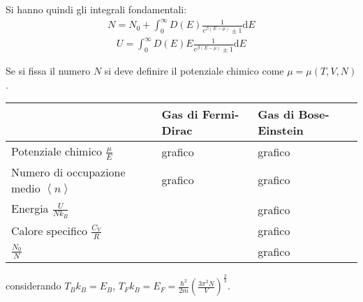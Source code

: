 Si hanno quindi gli integrali fondamentali:
\begin{equation}\begin{split}
N=N_0+\int_{0}^{\infty }{D\left(E\right)\frac{1}{e^{\beta\left(E-\mu\right)}\pm 1} \textrm{d}E}
\end{split}\end{equation}
\begin{equation}\begin{split}
U=\int_{0}^{\infty }{D\left(E\right)E\frac{1}{e^{\beta\left(E-\mu\right)}\pm 1} \textrm{d}E}
\end{split}\end{equation}

Se si fissa il numero $N$ si deve definire il potenziale chimico come $\mu=\mu\left(T,V,N\right)$.

\begin{tabularx}{\textwidth}{lXX}
\toprule
 & Gas di Fermi-Dirac & Gas di Bose-Einstein \\
\midrule
Potenziale chimico $\frac{\mu}{E}$ & grafico & grafico \\
Numero di occupazione medio $\left\langle n \right\rangle$ & grafico & grafico \\
Energia $\frac{U}{Nk_B}$ &  & grafico \\
Calore specifico $\frac{C_V}{R}$ &  & grafico \\
$\frac{N_0}{N}$ &  & grafico \\
\bottomrule
\end{tabularx}
considerando $T_Bk_B=E_B$, $T_Fk_B=E_F=\frac{\hbar ^2}{2m}\left(\frac{3\pi^2N}{V}\right)^{\frac{2}{3}}$.